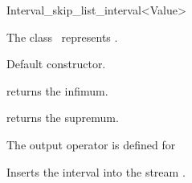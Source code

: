 \begin{ccRefClass} {Interval_skip_list_interval<Value>}

\ccDefinition

The class \ccClassTemplateName\ represents .


\ccTypes
{}
\ccThreeToTwo



\ccCreation
{}

{Default constructor.}


\ccOperations

{returns the infimum.}

{returns the supremum.}


The output operator is defined for 

{Inserts the interval  into the stream .}


\end{ccRefClass}

